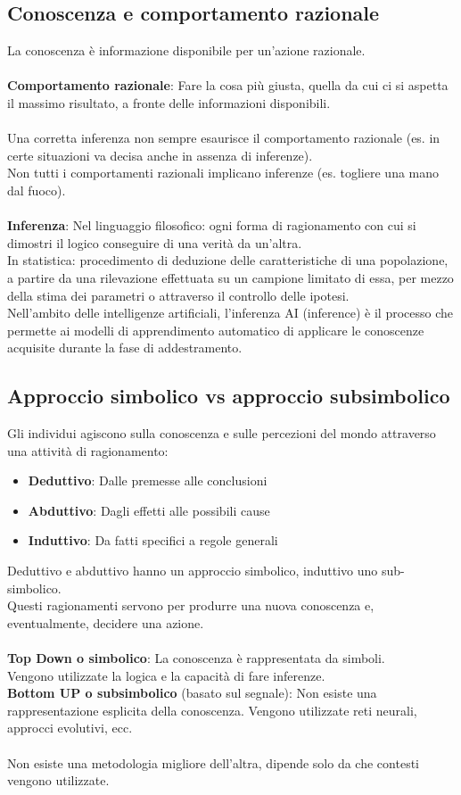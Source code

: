 \documentclass[../main.tex]{subfiles}
\begin{document}
	\subsection{Conoscenza e comportamento razionale}
	La conoscenza è informazione disponibile per un'azione razionale.\\ \\
	\textbf{Comportamento razionale}: Fare la cosa più giusta, quella da cui ci si aspetta il massimo risultato, a fronte delle informazioni disponibili.\\ \\
	Una corretta inferenza non sempre esaurisce il comportamento razionale (es. in certe situazioni va decisa anche in assenza di inferenze). \\
	Non tutti i comportamenti razionali implicano inferenze (es. togliere una mano dal fuoco).\\\\
	\textbf{Inferenza}: Nel linguaggio filosofico: ogni forma di ragionamento con cui si dimostri il logico conseguire di una verità da un’altra.\\
	In statistica: procedimento di deduzione delle caratteristiche di una popolazione, a partire da una rilevazione effettuata su un campione limitato di essa, per mezzo della stima dei parametri o attraverso il controllo delle ipotesi.\\
	Nell'ambito delle intelligenze artificiali, l'inferenza AI (inference) è il processo che permette ai modelli di apprendimento automatico di applicare le conoscenze acquisite durante la fase di addestramento.
	\subsection{Approccio simbolico vs approccio subsimbolico}
	Gli individui agiscono sulla conoscenza e sulle percezioni del mondo attraverso una attività di ragionamento:
	\begin{itemize}
		\item \textbf{Deduttivo}: Dalle premesse alle conclusioni
		\item \textbf{Abduttivo}: Dagli effetti alle possibili cause
		\item \textbf{Induttivo}: Da fatti specifici a regole generali
	\end{itemize}
	Deduttivo e abduttivo hanno un approccio simbolico, induttivo uno sub-simbolico.\\
	Questi ragionamenti servono per produrre una nuova conoscenza e, eventualmente, decidere una azione.\\ \\
	\textbf{Top Down o simbolico}: La conoscenza è rappresentata da simboli. \\
	Vengono utilizzate la logica e la capacità di fare inferenze.\\
	\textbf{Bottom UP o subsimbolico} (basato sul segnale): Non esiste una rappresentazione esplicita della conoscenza. Vengono utilizzate reti neurali, approcci evolutivi, ecc.\\ \\
	Non esiste una metodologia migliore dell’altra, dipende solo da che contesti vengono utilizzate.
\end{document}
